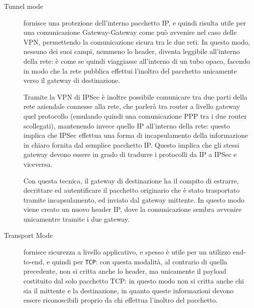 \begin{description}
\item[Tunnel mode] fornisce una protezione dell'interno pacchetto IP, e quindi
	risulta utile per una comunicazione Gateway-Gateway come può avvenire
	nel caso delle VPN, permettendo la comunicazione sicura tra le due reti.
	In questo modo, nessuno dei suoi campi, nemmeno lo header, diventa
	leggibile all'interno della rete: è come se quindi viaggiasse all'interno
	di un tubo opaco, facendo in modo che la rete pubblica effettui l'inoltro
	del pacchetto unicamente verso il gateway di destinazione.

	Tramite la VPN di IPSec è inoltre possibile comunicare tra due parti 
	della rete aziendale connesse alla rete, che parlerà tra router a livello 
	gateway quel protocollo (emulando quindi una comunicazione PPP tra i due
	router scollegati), mantenendo invece quello IP all'interno della rete: 
	questo implica che IPSec effettua una forma di incapsulamento della 
	informazione in chiaro fornita dal semplice pacchetto IP. Questo implica 
	che gli stessi gateway devono essere in grado di tradurre i protocolli da 
	IP a IPSec e viceversa.
	
	Con questa tecnica, il gateway di destinazione ha il compito di estrarre,
	decrittare ed autentificare il pacchetto originario che è stato trasportato
	tramite incapsulamento, ed inviato dal gateway mittente. In questo modo
	viene creato un nuovo header IP, dove la comunicazione sembra avvenire
	unicamentre tramite i due gateway.
\item[Transport Mode] fornisce sicurezza a livello applicativo, e spesso è utile
	per un utilizzo end-to-end, e quindi per \texttt{TCP}: con questa modalità,
	al contrario di quella precedente, non si critta anche lo header, ma
	unicamente il payload costituito dal solo pacchetto TCP: in questo modo
	non si critta anche chi sia il mittente e la destinazione, in quanto
	queste informazioni devono essere riconoscibili proprio da chi effettua
	l'inoltro del pacchetto.
\end{description}
